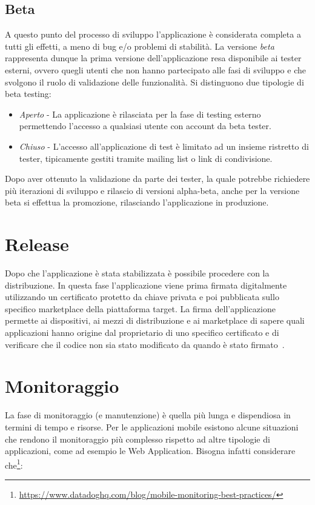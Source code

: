 \subsection{Beta}
A questo punto del processo di sviluppo l'applicazione è considerata completa a tutti gli effetti,
a meno di bug e/o problemi di stabilità. 
La versione \textit{beta} rappresenta dunque la prima versione dell'applicazione resa disponibile ai tester esterni, 
ovvero quegli utenti che non hanno partecipato alle fasi di sviluppo e che svolgono il ruolo di validazione delle funzionalità. 
Si distinguono due tipologie di beta testing:

\begin{itemize}
    \item \textit{Aperto} - La applicazione è rilasciata per la fase di testing esterno permettendo l'accesso a qualsiasi utente con account da beta tester.
    
    \item \textit{Chiuso} - L'accesso all'applicazione di test è limitato ad un insieme ristretto di tester, tipicamente gestiti tramite mailing list o link di condivisione.
\end{itemize}

Dopo aver ottenuto la validazione da parte dei tester, 
la quale potrebbe richiedere più iterazioni di sviluppo e rilascio di versioni alpha-beta,
anche per la versione beta si effettua la promozione,
rilasciando l'applicazione in produzione.

\section{Release}
Dopo che l'applicazione è stata stabilizzata è possibile procedere con la distribuzione.
In questa fase l'applicazione viene prima firmata digitalmente utilizzando un certificato protetto da chiave privata e poi pubblicata sullo specifico marketplace della piattaforma target. 
La firma dell'applicazione permette ai dispositivi, 
ai mezzi di distribuzione e ai marketplace di sapere quali applicazioni hanno origine dal proprietario di uno specifico certificato e di verificare che il codice non sia stato modificato da quando è stato firmato~\cite{mednieks2011programming}.

\section{Monitoraggio}
La fase di monitoraggio (e manutenzione) è quella più lunga e dispendiosa in termini di tempo e risorse. 
Per le applicazioni mobile esistono alcune situazioni che rendono il monitoraggio più complesso rispetto ad altre tipologie di applicazioni, 
come ad esempio le Web Application. 
Bisogna infatti considerare che\footnote{\href{https://www.datadoghq.com/blog/mobile-monitoring-best-practices/}{https://www.datadoghq.com/blog/mobile-monitoring-best-practices/}}:

